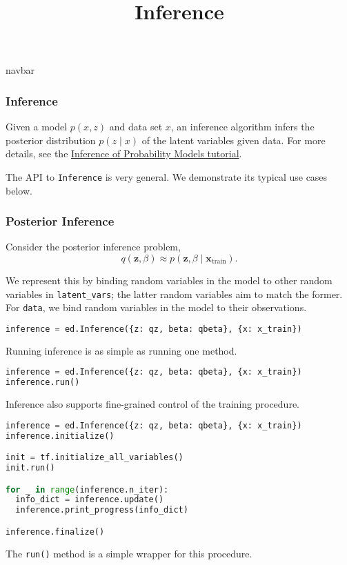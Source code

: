 \title{Inference}

{{navbar}}

\subsubsection{Inference}

Given a model $p(x, z)$ and data set $x$,
an inference algorithm infers the posterior distribution $p(z\mid x)$
of the latent variables given data. For more details, see the
\href{/tutorials/inference}
{Inference of Probability Models tutorial}.

The API to \texttt{Inference} is very general. We demonstrate its typical use cases below.

\subsubsection{Posterior Inference}

Consider the posterior inference problem,
\begin{equation*}
q(\mathbf{z}, \beta)\approx p(\mathbf{z}, \beta\mid \mathbf{x}_{\text{train}}).
\end{equation*}

We represent this by binding random variables in the model to other
random variables in \texttt{latent_vars}; the latter random variables
aim to match the former. For \texttt{data}, we bind random variables
in the model to their observations.

\begin{lstlisting}[language=Python]
inference = ed.Inference({z: qz, beta: qbeta}, {x: x_train})
\end{lstlisting}

Running inference is as simple as running one method.
\begin{lstlisting}[language=Python]
inference = ed.Inference({z: qz, beta: qbeta}, {x: x_train})
inference.run()
\end{lstlisting}
%
Inference also supports fine-grained control of the training procedure.
%
\begin{lstlisting}[language=Python]
inference = ed.Inference({z: qz, beta: qbeta}, {x: x_train})
inference.initialize()

init = tf.initialize_all_variables()
init.run()

for _ in range(inference.n_iter):
  info_dict = inference.update()
  inference.print_progress(info_dict)

inference.finalize()
\end{lstlisting}
The \texttt{run()} method is a simple wrapper for this procedure.

